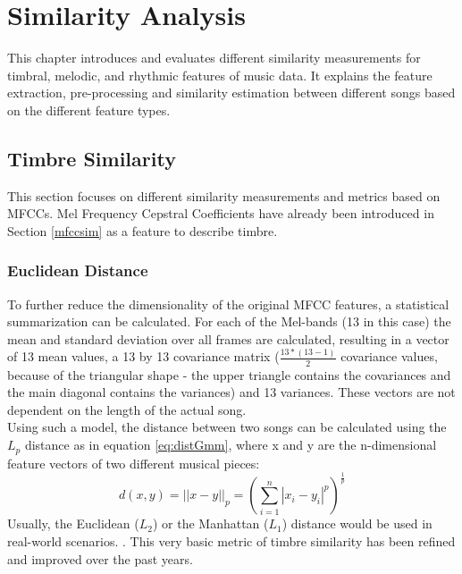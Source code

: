 
\chapter{Similarity Analysis}\label{simanal}


This chapter introduces and evaluates different similarity measurements for timbral, melodic, and rhythmic features of music data. It explains the feature extraction, pre-processing and similarity estimation between different songs based on the different feature types. 

\section{Timbre Similarity} \label{musly}

This section focuses on different similarity measurements and metrics based on MFCCs. Mel Frequency Cepstral Coefficients have already been introduced in Section \ref{mfccsim} as a feature to describe timbre.\\

\subsection{Euclidean Distance}\label{mfcceuc}

To further reduce the dimensionality of the original MFCC features, a statistical summarization can be calculated. For each of the Mel-bands (13 in this case) the mean and standard deviation over all frames are calculated, resulting in a vector of 13 mean values, a 13 by 13 covariance matrix ($\frac{13*(13-1)}{2}$ covariance values, because of the triangular shape - the upper triangle contains the covariances and the main diagonal contains the variances) and 13 variances. These vectors are not dependent on the length of the actual song. \cite[pp. 51ff]{knees1}\\
Using such a model, the distance between two songs can be calculated using the $L_p$ distance as in equation \eqref{eq:distGmm}, where x and y are the n-dimensional feature vectors of two different musical pieces:
\begin{equation} \label{eq:distGmm}
d(x, y) = ||x - y||_p = \left(\sum_{i=1}^{n}{|x_i - y_i|^p}\right)^{\frac{1}{p}}
\end{equation}
Usually, the Euclidean ($L_2$) or the Manhattan ($L_1$) distance would be used in real-world scenarios. \cite[p. 58]{knees1}. This very basic metric of timbre similarity has been refined and improved over the past years.

